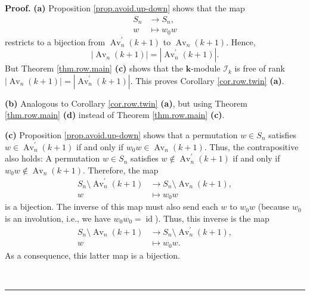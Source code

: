 \documentclass[numbers=enddot,12pt,final,onecolumn,notitlepage]{scrartcl}%
\numberwithin{exer}{subsection}
\theoremstyle{definition}
\newenvironment{proof}[1][Proof]{\noindent\textbf{#1.} }{\ \rule{0.5em}{0.5em}}
\begin{document}
\begin{proof}
\textbf{(a)} Proposition \ref{prop.avoid.up-down} shows that the map%
\begin{align*}
S_{n}  &  \rightarrow S_{n},\\
w  &  \mapsto w_{0}w
\end{align*}
restricts to a bijection from $\operatorname*{Av}\nolimits_{n}^{\prime}\left(
k+1\right)  $ to $\operatorname*{Av}\nolimits_{n}\left(  k+1\right)  $.
Hence,
\begin{equation}
\left\vert \operatorname*{Av}\nolimits_{n}\left(  k+1\right)  \right\vert
=\left\vert \operatorname*{Av}\nolimits_{n}^{\prime}\left(  k+1\right)
\right\vert . \label{pf.cor.row.twin.a.=}%
\end{equation}
But Theorem \ref{thm.row.main} \textbf{(c)} shows that the $\mathbf{k}$-module
$\mathcal{I}_{k}$ is free of rank $\left\vert \operatorname*{Av}%
\nolimits_{n}\left(  k+1\right)  \right\vert =\left\vert \operatorname*{Av}%
\nolimits_{n}^{\prime}\left(  k+1\right)  \right\vert $. This proves Corollary
\ref{cor.row.twin} \textbf{(a)}. \medskip

\textbf{(b)} Analogous to Corollary \ref{cor.row.twin} \textbf{(a)}, but using
Theorem \ref{thm.row.main} \textbf{(d)} instead of Theorem \ref{thm.row.main}
\textbf{(c)}. \medskip

\textbf{(c)} Proposition \ref{prop.avoid.up-down} shows that a permutation
$w\in S_{n}$ satisfies $w\in\operatorname*{Av}\nolimits_{n}^{\prime}\left(
k+1\right)  $ if and only if $w_{0}w\in\operatorname*{Av}\nolimits_{n}\left(
k+1\right)  $. Thus, the contrapositive also holds: A permutation $w\in S_{n}$
satisfies $w\notin\operatorname*{Av}\nolimits_{n}^{\prime}\left(  k+1\right)
$ if and only if $w_{0}w\notin\operatorname*{Av}\nolimits_{n}\left(
k+1\right)  $. Therefore, the map%
\begin{align}
S_{n}\setminus\operatorname*{Av}\nolimits_{n}^{\prime}\left(  k+1\right)   &
\rightarrow S_{n}\setminus\operatorname*{Av}\nolimits_{n}\left(  k+1\right)
,\nonumber\\
w  &  \mapsto w_{0}w \label{pf.cor.row.twin.c.b1}%
\end{align}
is a bijection. The inverse of this map must also send each $w$ to $w_{0}w$
(because $w_{0}$ is an involution, i.e., we have $w_{0}w_{0}%
=\operatorname*{id}$). Thus, this inverse is the map%
\begin{align}
S_{n}\setminus\operatorname*{Av}\nolimits_{n}\left(  k+1\right)   &
\rightarrow S_{n}\setminus\operatorname*{Av}\nolimits_{n}^{\prime}\left(
k+1\right)  ,\nonumber\\
w  &  \mapsto w_{0}w. \label{pf.cor.row.twin.c.b2}%
\end{align}
As a consequence, this latter map is a bijection.


\end{proof}
\end{document}
